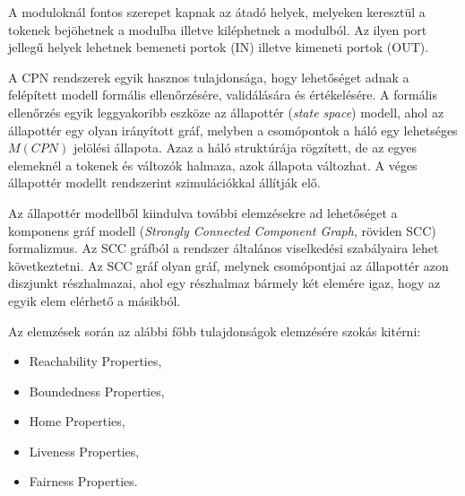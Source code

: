 A moduloknál fontos szerepet kapnak az átadó helyek, melyeken keresztül a tokenek bejöhetnek a modulba illetve kiléphetnek a modulból. Az ilyen port jellegű helyek lehetnek bemeneti portok (IN) illetve kimeneti portok (OUT).  

A CPN rendszerek egyik hasznos tulajdonsága, hogy lehetőséget adnak a felépített modell formális ellenőrzésére, validálására és értékelésére. A formális ellenőrzés egyik leggyakoribb eszköze az állapottér (\textit{state space})  modell, ahol az állapottér egy olyan irányított gráf, melyben a csomópontok a háló egy lehetséges  $M(CPN)$ jelölési állapota. Azaz a háló struktúrája rögzített, de az egyes elemeknél a tokenek és változók halmaza, azok állapota változhat. A véges állapottér modellt rendszerint szimulációkkal állítják elő. 

Az állapottér modellből kiindulva további elemzésekre ad lehetőséget a komponens gráf modell (\textit{Strongly Connected Component Graph}, röviden SCC) formalizmus. Az SCC gráfból a rendszer általános viselkedési szabályaira lehet következtetni. Az SCC gráf olyan gráf, melynek csomópontjai az állapottér azon diszjunkt részhalmazai, ahol egy részhalmaz bármely két elemére igaz, hogy az egyik elem  elérhető a másikból. 

Az elemzések során az alábbi főbb tulajdonságok elemzésére szokás kitérni:
\begin{itemize}
\item Reachability Properties,
\item Boundedness Properties,
\item Home Properties,
\item Liveness Properties,
\item Fairness Properties.
\end{itemize}

